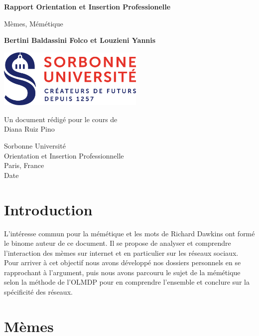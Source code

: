 \documentclass[12pt]{article}
\date{}
\begin{document}
\begin{titlepage}
	\begin{center}
		\vspace*{1cm}
	
		{\Large \textbf{Rapport Orientation et Insertion Professionelle}}
		
		\vspace{0.5cm}
		Mèmes, Mémétique
		
		\vspace{1.5cm}
		
		\textbf{Bertini Baldassini Folco et Louzieni Yannis}
		

		\vfill


 		\includegraphics[width=7cm]{serveimage.png}
		\vspace{1.2cm}
		
		Un document rédigé pour le cours de\\
		Diana Ruiz Pino
		
		\vspace{1.2cm}
		
		Sorbonne Université\\
		Orientation et Insertion Professionnelle\\
		Paris, France\\
		Date
		
	\end{center}
\newpage
\tableofcontents

\end{titlepage}

\section{Introduction}
L'intéresse commun pour la mémétique et les mots de Richard Dawkins ont formé le binome auteur de ce document. Il se propose de analyser et comprendre l'interaction des mèmes sur internet et en particulier sur les réseaux sociaux. Pour arriver à cet objectif nous avons développé nos dossiers personnels en se rapprochant à l'argument, puis nous avons parcouru le sujet de la mémétique selon la méthode de l'OLMDP pour en comprendre l'ensemble et conclure sur la spécificité des réseaux.

\section{Mèmes}
\end{document}
